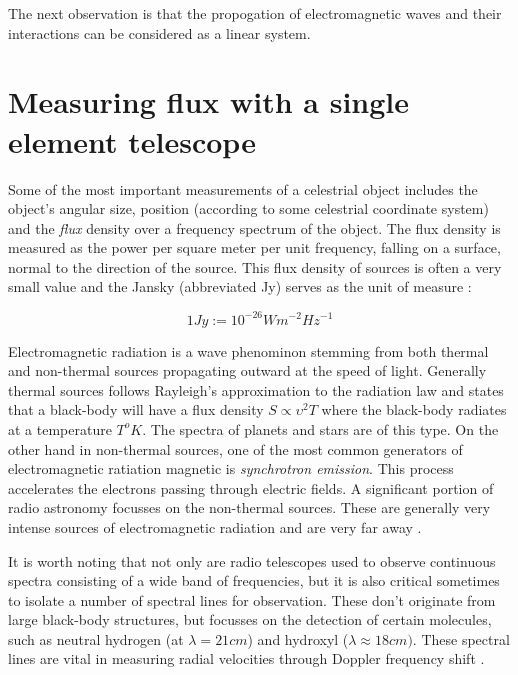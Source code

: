 \documentclass[a4paper,10pt]{report}
\begin{document}
The next observation is that the propogation of electromagnetic waves and their interactions can be considered as a linear system.

\section{Measuring flux with a single element telescope}
Some of the most important measurements of a celestrial object includes the object's angular size, position (according to some celestrial coordinate system) and the \textit{flux} density over a 
frequency spectrum of the object. The flux density is measured as the power per square meter per unit frequency, falling on a surface, normal to the direction of the source. This flux 
density of sources is often a very small value and the Jansky (abbreviated Jy) serves as the unit of measure \cite{christiansenradiotelescopes,wilson2009tools}:

\begin{equation*}
 1 Jy := 10^{-26}Wm^{-2}Hz^{-1}
\end{equation*}

Electromagnetic radiation is a wave phenominon stemming from both thermal and non-thermal sources propagating outward at the speed of light. Generally thermal sources follows Rayleigh's approximation to the radiation 
law and states that a black-body will have a flux density $S\propto \upsilon^2T$ where the black-body radiates at a temperature $T^oK$. The spectra of planets and stars are of this type. On the other hand in non-thermal 
sources, one of the most common generators of electromagnetic ratiation magnetic is \textit{synchrotron emission}. This process accelerates the electrons passing through electric fields. A significant portion of radio 
astronomy focusses on the non-thermal sources. These are generally very intense sources of electromagnetic radiation and are very far away \cite{christiansenradiotelescopes}.

It is worth noting that not only are radio telescopes used to observe continuous spectra consisting of a wide band of frequencies, but it is also critical sometimes to isolate a number of
spectral lines for observation. These don't originate from large black-body structures, but focusses on the detection of certain molecules, such as neutral hydrogen (at $\lambda = 21 cm$) and
hydroxyl ($\lambda \approx 18 cm)$. These spectral lines are vital in measuring radial velocities through Doppler frequency shift \cite{christiansenradiotelescopes}.
\end{document}
